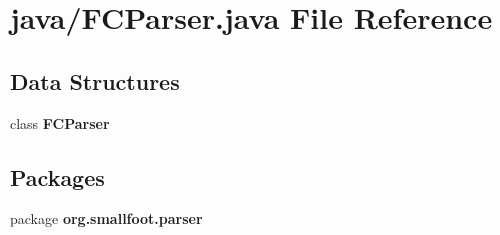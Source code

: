 \section{java/\+F\+C\+Parser.java File Reference}
\label{FCParser_8java}
\subsection*{Data Structures}
\begin{DoxyCompactItemize}
\item 
class {\bf F\+C\+Parser}
\end{DoxyCompactItemize}
\subsection*{Packages}
\begin{DoxyCompactItemize}
\item 
package {\bf org.\+smallfoot.\+parser}
\end{DoxyCompactItemize}
